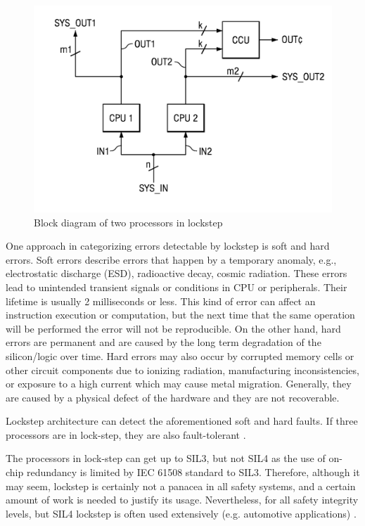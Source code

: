 \begin{figure}[H]

      \centering
      \includegraphics[width=0.9\linewidth]{images/patent_not_delayed.png}
      \caption{Block diagram of two processors in lockstep \citep{patent_delayed_lockstep}}
      \label{fig:patent_not_delayed}
    
\end{figure}

One approach in categorizing errors detectable by lockstep is soft and hard errors. Soft errors describe errors that happen by a temporary anomaly, e.g., electrostatic discharge (ESD), radioactive decay, cosmic radiation. These errors lead to unintended transient signals or conditions in CPU or peripherals. Their lifetime is usually 2 milliseconds or less. This kind of error can affect an instruction execution or computation, but
the next time that the same operation will be performed the error will not be reproducible. On the other hand, hard errors are permanent and are caused by the
long term degradation of the silicon/logic over time. Hard errors may also occur
by corrupted memory cells or other circuit components due to ionizing radiation,
manufacturing inconsistencies, or exposure to a high current which may cause
metal migration. Generally, they are caused by a physical defect of the hardware and
they are not recoverable.

Lockstep architecture can detect the aforementioned soft and hard faults. If three processors are in lock-step, they are also fault-tolerant \citep{lockstep_analysis}. 

The processors in lock-step can get up to SIL3, but not SIL4 as the use of on-chip redundancy is limited by IEC 61508 standard to SIL3. Therefore, although it may seem, lockstep is certainly not a panacea in all safety systems, and a certain amount of work is needed to justify its usage. Nevertheless, for all safety integrity levels, but SIL4 lockstep is often used extensively (e.g. automotive applications) \citep{ipavic_lockstep}. 

